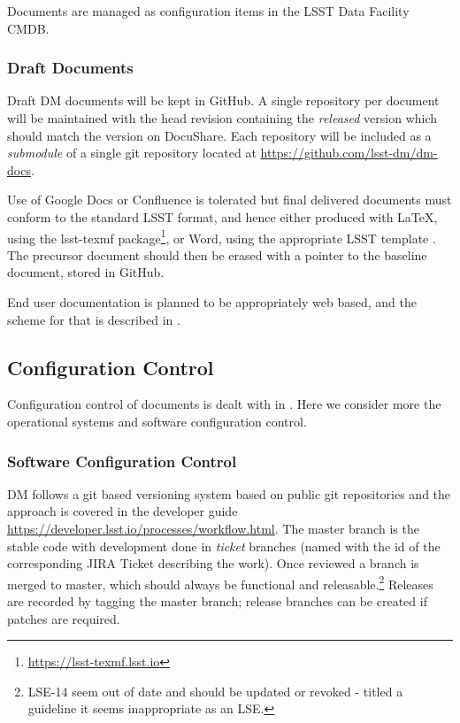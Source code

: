 Documents are managed as configuration items in the LSST Data Facility CMDB.

\subsubsection{Draft Documents}

Draft DM documents will be kept in GitHub. A single repository per document will be maintained with the head revision containing the \emph{released } version which should match the version on DocuShare. Each repository will be included as a \emph{submodule} of a single git repository located at \url{https://github.com/lsst-dm/dm-docs}.

Use of Google Docs or Confluence is tolerated but final delivered documents must conform to the standard LSST format, and hence either produced with LaTeX, using the lsst-texmf package\footnote{\url{https://lsst-texmf.lsst.io}}, or Word, using the appropriate LSST template . The precursor document should then be erased with a pointer to the baseline document, stored in GitHub.

End user documentation is planned to be appropriately web based, and the scheme for that is described in .

\subsection {Configuration Control} \label{sect:config}

Configuration control of documents is dealt with in . Here we consider more the operational systems and software configuration control.

\subsubsection{Software Configuration Control}

DM follows a git based versioning system based  on public git repositories and the approach is covered in the developer guide \url{https://developer.lsst.io/processes/workflow.html}.
The master branch is the stable code with development done in \emph{ticket} branches (named with the id of the corresponding JIRA Ticket describing the work).
Once reviewed a branch is merged to master, which should always be functional and releasable.\footnote{LSE-14 seem out of date and should be updated or revoked - titled a guideline it seems inappropriate as an LSE.}
Releases are recorded by tagging the master branch; release branches can be created if patches are required.

